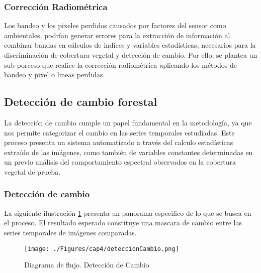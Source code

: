 \subsubsection{Correcci\'on Radiom\'etrica}
Los bandeo y los pixeles perdidos causados por factores del sensor como ambientales, podr\'ian generar errores para la extracci\'on de informaci\'on al combinar bandas en c\'alculos de indices y variables estad\'isticas, necesarios para la discriminaci\'on de cobertura vegetal y detecci\'on de cambio. Por ello, se plantea un sub-porceso que realice la correcci\'on radiom\'etrica aplicando los m\'etodos de bandeo y pixel o lineas perdidas.

\subsection{Detecci\'on de cambio forestal}
La detecci\'on de cambio cumple un papel fundamental en la metodolog\'ia, ya que nos permite categorizar el cambio en las series temporales estudiadas. Este proceso presenta un sistema automatizado a trav\'es del calculo estad\'isticas extra\'ido de las im\'agenes, como tambi\'en de variables constantes determinadas en un previo an\'alisis del comportamiento espectral observados en la cobertura vegetal de prueba.

\subsubsection{Detecci\'on de cambio}
La siguiente ilustraci\'on \ref{fig:deteccionCambio} presenta un panorama especifico de lo que se busca en el proceso. El resultado esperado constituye una mascara de cambio entre las series temporales de im\'agenes comparadas.
\begin{figure}[H]
	\centering
	\texttt{[image: ./Figures/cap4/deteccionCambio.png]}
	\caption{Diagrama de flujo. Detecci\'on de Cambio.}
	\label{fig:deteccionCambio}
\end{figure}

